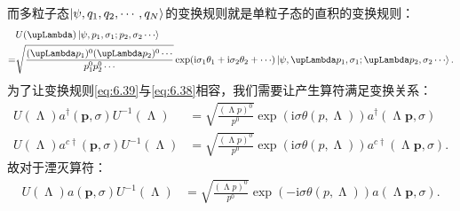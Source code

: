 而多粒子态$\ket{\psi ,q_{1} ,q_{2} ,\cdots ,q_{N}}$的变换规则就是单粒子态的直积的变换规则：
\begin{equation*}
	\begin{aligned}
		& U( \upLambda )\ket{\psi ,p_{1} ,\sigma _{1} ;p_{2} ,\sigma _{2} \cdots }\\
		= & \sqrt{\frac{( \upLambda p_{1})^{0} (\upLambda p_{2} )^{0} \cdots }{p_{1}^{0} p_{2}^{0} \cdots }}\exp(\mathrm{i} \sigma _{1} \theta _{1} +\mathrm{i} \sigma _{2} \theta _{2} +\cdots )\ket{\psi ,\upLambda p_{1} ,\sigma _{1} ;\upLambda p_{2} ,\sigma _{2} \cdots } .
	\end{aligned}
\end{equation*}
为了让变换规则\ref{eq:6.39}与\ref{eq:6.38}相容，我们需要让产生算符满足变换关系：
\begin{equation*}
	\begin{aligned}
		U( \upLambda ) a^{\dagger }(\boldsymbol{p} ,\sigma ) U^{-1}( \upLambda ) & =\sqrt{\frac{( \upLambda p)^{0}}{p^{0}}}\exp(\mathrm{i} \sigma \theta ( p,\upLambda )) a^{\dagger }( \upLambda \boldsymbol{p} ,\sigma )\\
		U( \upLambda ) a^{c\dagger }(\boldsymbol{p} ,\sigma ) U^{-1}( \upLambda ) & =\sqrt{\frac{( \upLambda p)^{0}}{p^{0}}}\exp(\mathrm{i} \sigma \theta ( p,\upLambda )) a^{c\dagger }( \upLambda \boldsymbol{p} ,\sigma ) .
	\end{aligned}
\end{equation*}
故对于湮灭算符：
\begin{equation*}
	\begin{aligned}
		U( \upLambda ) a(\boldsymbol{p} ,\sigma ) U^{-1}( \upLambda ) & =\sqrt{\frac{( \upLambda p)^{0}}{p^{0}}}\exp( -\mathrm{i} \sigma \theta ( p,\upLambda )) a( \upLambda \boldsymbol{p} ,\sigma ) .
	\end{aligned}
\end{equation*}


